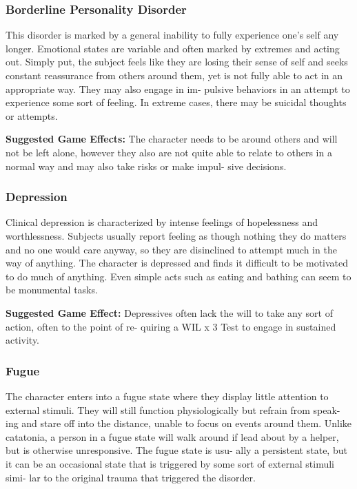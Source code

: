 \subsubsection{Borderline Personality Disorder}

This disorder is marked by a general inability to fully 
experience one's self any longer. Emotional states are 
variable and often marked by extremes and acting 
out. Simply put, the subject feels like they are losing 
their sense of self and seeks constant reassurance 
from others around them, yet is not fully able to act 
in an appropriate way. They may also engage in im-
pulsive behaviors in an attempt to experience some 
sort of feeling. In extreme cases, there may be suicidal 
thoughts or attempts.

\textbf{Suggested Game Effects: }The character needs to 
be around others and will not be left alone, however 
they also are not quite able to relate to others in a 
normal way and may also take risks or make impul-
sive decisions.

\subsubsection{Depression}

Clinical depression is characterized by intense feelings 
of hopelessness and worthlessness. Subjects usually 
report feeling as though nothing they do matters and 
no one would care anyway, so they are disinclined to 
attempt much in the way of anything. The character is 
depressed and finds it difficult to be motivated to do 
much of anything. Even simple acts such as eating and 
bathing can seem to be monumental tasks.

\textbf{Suggested Game Effect:} Depressives often lack the 
will to take any sort of action, often to the point of re-
quiring a WIL x 3 Test to engage in sustained activity.

\subsubsection{Fugue}

The character enters into a fugue state where they 
display little attention to external stimuli. They will 
still function physiologically but refrain from speak-
ing and stare off into the distance, unable to focus on 
events around them. Unlike catatonia, a person in a 
fugue state will walk around if lead about by a helper, 
but is otherwise unresponsive. The fugue state is usu-
ally a persistent state, but it can be an occasional state 
that is triggered by some sort of external stimuli simi-
lar to the original trauma that triggered the disorder.

